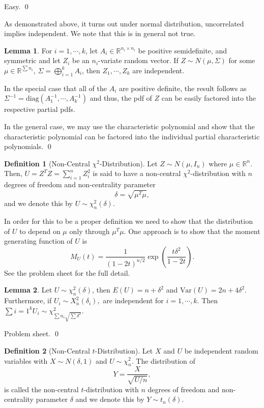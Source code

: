 \documentclass[
]{article}
\theoremstyle{definition}
\theoremstyle{definition}
\newtheorem{definition}{Definition}[section]
\newtheorem{lemma}{Lemma}[section]
\begin{document}
Easy. \qed

As demonstrated above, it turns out under normal distribution,
uncorrelated implies independent. We note that this is in general not
true.

\begin{lemma}
  For \(i = 1, \cdots, k\), let \(A_i \in \mathbb{R}^{n_i \times n_i}\) be 
  positive semidefinite, and symmetric and let \(Z_i\) be an \(n_i\)-variate 
  random vector. If \(Z \sim N(\mu, \Sigma)\) for some \(\mu \in \mathbb{R}^{\sum n_i}\), 
  \(\Sigma = \bigoplus_{i = 1}^k A_i\), then \(Z_1, \cdots, Z_k\) are independent.
\end{lemma}
\proof

In the special case that all of the \(A_i\) are positive definite, the
result follows as
\(\Sigma^{-1} = \text{diag}(A_1^{-1}, \cdots, A_k^{-1})\) and thus, the
pdf of \(Z\) can be easily factored into the respective partial pdfs.

In the general case, we may use the characteristic polynomial and show
that the characteristic polynomial can be factored into the individual
partial characteristic polynomials. \qed

\begin{definition}[Non-Central \(\chi^2\)-Distribution]
  Let \(Z \sim N(\mu, I_n)\) where \(\mu \in \mathbb{R}^n\). Then, 
  \(U = Z^T Z = \sum_{i = 1}^n Z_i^2\) is said to have a non-central \(\chi^2\)-distribution 
  with \(n\) degrees of freedom and non-centrality parameter 
  \[\delta = \sqrt{\mu^T \mu},\]
  and we denote this by \(U \sim \chi_n^2(\delta)\).
\end{definition}

In order for this to be a proper definition we need to show that the
distribution of \(U\) to depend on \(\mu\) only through \(\mu^T \mu\).
One approach is to show that the moment generating function of \(U\) is
\[M_U(t) = \frac{1}{(1 - 2t)^{n / 2}} \exp \left(\frac{t\delta^2}{1 - 2t}\right).\]
See the problem sheet for the full detail.

\begin{lemma}
  Let \(U \sim \chi_n^2(\delta)\), then \(E(U) = n + \delta^2\) and 
  \(\text{Var}(U) = 2n + 4 \delta^2\). Furthermore, if \(U_i \sim X_n^2(\delta_i),\) 
  are independent for \(i = 1, \cdots, k\). Then \(\sum{i = 1}^k U_i \sim 
  \chi_{\sum n_i \sqrt{\sum \delta^2}}^2\).
\end{lemma}
\proof

Problem sheet. \qed

\begin{definition}[Non-Central \(t\)-Distribution]
  Let \(X\) and \(U\) be independent random variables with \(X \sim N(\delta, 1)\) 
  and \(U \sim \chi_n^2\). The distribution of 
  \[Y = \frac{X}{\sqrt{U / n}},\]
  is called the non-central \(t\)-distribution with \(n\) degrees of freedom and 
  non-centrality parameter \(\delta\) and we denote this by 
  \(Y \sim t_n(\delta)\).
\end{definition}
\end{document}
